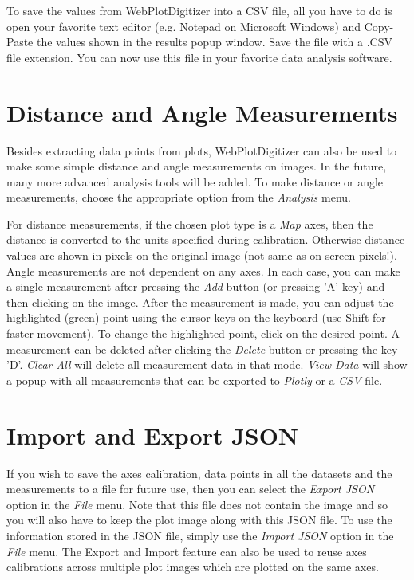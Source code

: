 \documentclass[letterpaper, 10pt]{article}
\begin{document}
To save the values from WebPlotDigitizer into a CSV file, all you have to do is open your favorite text editor (e.g. Notepad on Microsoft Windows) and Copy-Paste the values shown in the results popup window. Save the file with a .CSV file extension. You can now use this file in your favorite data analysis software.


\section{Distance and Angle Measurements}
Besides extracting data points from plots, WebPlotDigitizer can also be used to make some simple distance and angle measurements on images. In the future, many more advanced analysis tools will be added. To make distance or angle measurements, choose the appropriate option from the \emph{Analysis} menu.

For distance measurements, if the chosen plot type is a \emph{Map} axes, then the distance is converted to the units specified during calibration. Otherwise distance values are shown in pixels on the original image (not same as on-screen pixels!). Angle measurements are not dependent on any axes. In each case, you can make a single measurement after pressing the \emph{Add} button (or pressing 'A' key) and then clicking on the image. After the measurement is made, you can adjust the highlighted (green) point using the cursor keys on the keyboard (use Shift for faster movement). To change the highlighted point, click on the desired point. A measurement can be deleted after clicking the \emph{Delete} button or pressing the key 'D'. \emph{Clear All} will delete all measurement data in that mode. \emph{View Data} will show a popup with all measurements that can be exported to \emph{Plotly} or a \emph{CSV} file.

\section{Import and Export JSON}
If you wish to save the axes calibration, data points in all the datasets and the measurements to a file for future use, then you can select the \emph{Export JSON} option in the \emph{File} menu. Note that this file does not contain the image and so you will also have to keep the plot image along with this JSON file. To use the information stored in the JSON file, simply use the \emph{Import JSON} option in the \emph{File} menu. The Export and Import feature can also be used to reuse axes calibrations across multiple plot images which are plotted on the same axes.
\end{document}
